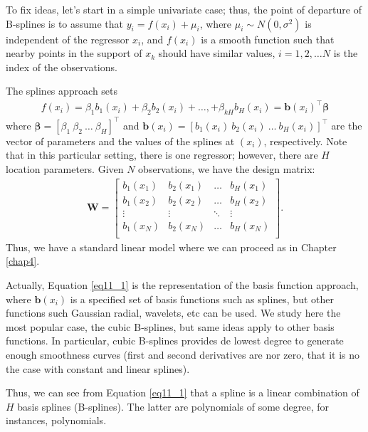 To fix ideas, let's start in a simple univariate case; thus, the point of departure of B-splines is to assume that $y_i=f(x_{i})+\mu_i$, where $\mu_i\sim N(0,\sigma^2)$ is independent of the regressor $x_{i}$, and $f(x_{i})$ is a smooth function such that nearby points in the support of $x_{k}$ should have similar values, $i=1,2,\dots N$ is the index of the observations. 

The splines approach sets 
\begin{align}\label{eq11_1}
	f(x_{i})=\beta_{1}b_1(x_{i})+\beta_{2}b_2(x_{i})+\dots,+\beta_{kH}b_H(x_{i})=\boldsymbol{b}(x_{i})^{\top}\boldsymbol{\beta}
\end{align}
where $\boldsymbol{\beta}=[\beta_{1} \ \beta_{2} \ \dots \ \beta_{H}]^{\top}$ and $\boldsymbol{b}(x_{i})=[b_1(x_{i}) \ b_2(x_{i}) \ \dots \ b_H(x_{i})]^{\top}$ are the vector of parameters and the values of the splines at $(x_{i})$, respectively. Note that in this particular setting, there is one regressor; however, there are $H$ location parameters. Given $N$ observations, we have the design matrix:
\begin{align*}
	\boldsymbol{W}=\begin{bmatrix}
		b_1(x_{1}) & b_2(x_{1}) & \dots & b_H(x_{1})\\
		b_1(x_{2}) & b_2(x_{2}) & \dots & b_H(x_{2})\\
		\vdots & \vdots & \ddots & \vdots \\
		b_1(x_{N}) & b_2(x_{N}) & \dots & b_H(x_{N})\\
	\end{bmatrix}.
\end{align*} 
Thus, we have a standard linear model where we can proceed as in Chapter \ref{chap4}.

Actually, Equation \ref{eq11_1} is the representation of the basis function approach, where $\boldsymbol{b}(x_{i})$ is a specified set of basis functions such as splines, but other functions such Gaussian radial, wavelets, etc can be used. We study here the most popular case, the cubic B-splines, but same ideas apply to other basis functions. In particular, cubic B-splines provides de lowest degree to generate enough smoothness curves (first and second derivatives are nor zero, that it is no the case with constant and linear splines)\cite{BMCP2021}.

Thus, we can see from Equation \ref{eq11_1} that a spline is a linear combination of $H$ basis splines (B-splines). The latter are polynomials of some degree, for instances, polynomials.

